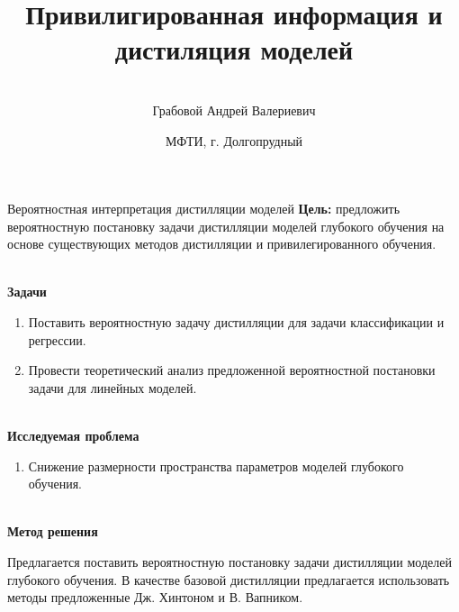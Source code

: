 \documentclass[9pt,pdf,hyperref={unicode}]{beamer}
\title[\hbox to 56mm{истилляция и привилигированная информация \hfill\insertframenumber\,/\,\inserttotalframenumber}]
{Привилигированная информация и дистиляция моделей}
\author[А.\,В.~Грабовой]{\large \\Грабовой Андрей Валериевич}
\institute{\large
Московский физико-технический институт}
\date{\footnotesize{МФТИ, г. Долгопрудный}}
\begin{document}
\begin{frame}
\titlepage
\end{frame}

\begin{frame}{Вероятностная интерпретация дистилляции моделей}
\justifying
\textbf{Цель:} предложить вероятностную постановку задачи дистилляции моделей глубокого обучения на основе существующих методов дистилляции и привилегированного обучения.



~\\
\textbf{Задачи}

\begin{enumerate}
\justifying
	\item Поставить вероятностную задачу дистилляции для задачи классификации и регрессии.
	\item Провести теоретический анализ предложенной вероятностной постановки задачи для линейных моделей.
\end{enumerate}

~\\
\textbf{Исследуемая проблема}
\begin{enumerate}
\justifying
	\item Снижение размерности пространства параметров моделей глубокого обучения.
\end{enumerate}

~\\
\textbf{Метод решения}

	Предлагается поставить вероятностную постановку задачи дистилляции моделей глубокого обучения. В качестве базовой дистилляции предлагается использовать методы предложенные Дж. Хинтоном и В. Вапником.
	
\end{frame}
\end{document}
